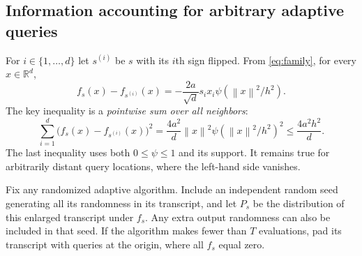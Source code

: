 \documentclass[11pt,a4paper]{article}
\newcommand{\R}{\mathbb R}
\newcommand{\norm}[1]{\left\lVert#1\right\rVert}
\theoremstyle{definition}
\theoremstyle{remark}
\begin{document}
\subsection{Information accounting for arbitrary adaptive queries}
\label{sec:information}
For $i\in\{1,\ldots,d\}$ let $s^{(i)}$ be $s$ with its $i$th sign flipped. From \eqref{eq:family}, for every $x\in\R^d$,
\begin{equation}\label{eq:neighbor}
 f_s(x)-f_{s^{(i)}}(x)
 =-\frac{2a}{\sqrt d}s_i x_i\psi(\norm x^2/h^2).
\end{equation}
The key inequality is a \emph{pointwise sum over all neighbors}:
\begin{equation}\label{eq:pointwise}
 \boxed{\quad
 \sum_{i=1}^d\big(f_s(x)-f_{s^{(i)}}(x)\big)^2
 =\frac{4a^2}{d}\norm x^2\psi(\norm x^2/h^2)^2
 \le\frac{4a^2h^2}{d}.
 \quad}
\end{equation}
The last inequality uses both $0\le\psi\le1$ and its support. It remains true for arbitrarily distant query locations, where the left-hand side vanishes.

Fix any randomized adaptive algorithm. Include an independent random seed generating all its randomness in its transcript, and let $P_s$ be the distribution of this enlarged transcript under $f_s$. Any extra output randomness can also be included in that seed. If the algorithm makes fewer than $T$ evaluations, pad its transcript with queries at the origin, where all $f_s$ equal zero.
\end{document}
